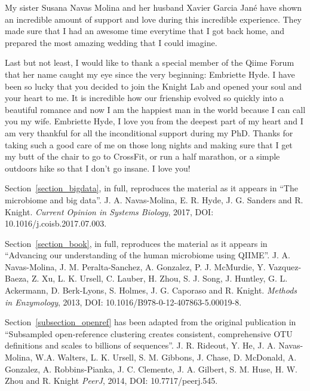 \begin{frontmatter}
\begin{acknowledgements}
    My sister Susana Navas Molina and her husband Xavier Garcia Jan\'e have shown
    an incredible amount of support and love during this incredible experience.
    They made sure that I had an awesome time everytime that I got back home, and
    prepared the most amazing wedding that I could imagine.

    Last but not least, I would like to thank a special member of the Qiime
    Forum that her name caught my eye since the very beginning: Embriette Hyde.
    I have been so lucky that you decided to join the Knight Lab and opened your
    soul and your heart to me. It is incredible how our frienship evolved so quickly
    into a beautiful romance and now I am the happiest man in the world because I can
    call you my wife. Embriette Hyde, I love you from the deepest part of my heart
    and I am very thankful for all the inconditional support during my PhD. Thanks
    for taking such a good care of me on those long nights and making sure that I get
    my butt of the chair to go to CrossFit, or run a half marathon, or a simple
    outdoors hike so that I don't go insane. I love you!

    Section~\ref{section_bigdata}, in full, reproduces the material as it
    appears in ``The microbiome and big data''. J. A. Navas-Molina, E. R. Hyde,
    J. G. Sanders and R. Knight. \emph{Current Opinion in Systems Biology},
    2017, DOI: 10.1016/j.coisb.2017.07.003.

	Section~\ref{section_book}, in full, reproduces the material as it
    appears in ``Advancing our understanding of the human microbiome using QIIME''.
	J. A. Navas-Molina, J. M. Peralta-Sanchez, A. Gonzalez, P. J. McMurdie,
	Y. Vazquez-Baeza, Z. Xu, L. K. Ursell, C. Lauber, H. Zhou, S. J. Song,
	J. Huntley, G. L. Ackermann, D. Berk-Lyons, S. Holmes, J. G. Caporaso and R.
	Knight. \emph{Methods in Enzymology}, 2013, DOI: 10.1016/B978-0-12-407863-5.00019-8.

    Section~\ref{subsection_openref} has been adapted from the original publication in
    ``Subsampled open-reference clustering creates consistent, comprehensive OTU
    definitions and scales to billions of sequences''. J. R. Rideout, Y. He,
    J. A. Navas-Molina, W.A. Walters, L. K. Ursell, S. M. Gibbons, J. Chase,
    D. McDonald, A. Gonzalez, A. Robbins-Pianka, J. C. Clemente, J. A. Gilbert,
    S. M. Huse, H. W. Zhou and R. Knight \emph{PeerJ}, 2014, DOI: 10.7717/peerj.545.


\end{acknowledgements}
\end{frontmatter}
